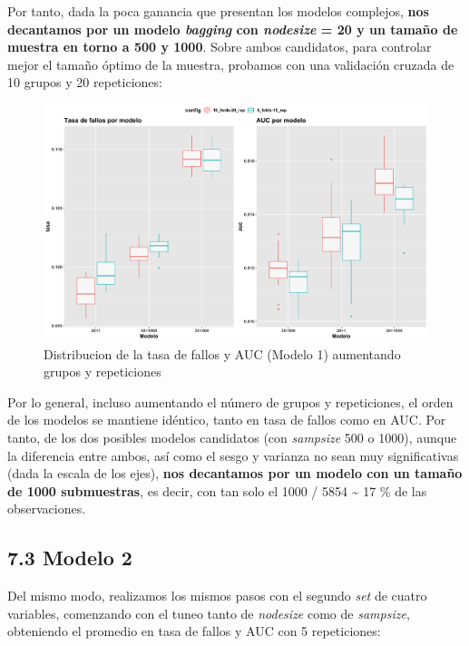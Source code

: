 \documentclass[
]{article}
\begin{document}
Por tanto, dada la poca ganancia que presentan los modelos complejos,
\textbf{nos decantamos por un modelo \emph{bagging} con \emph{nodesize}
= 20 y un tamaño de muestra en torno a 500 y 1000}. Sobre ambos
candidatos, para controlar mejor el tamaño óptimo de la muestra,
probamos con una validación cruzada de 10 grupos y 20 repeticiones:

\begin{figure}[h!]

{\centering \includegraphics[width=0.99\linewidth,height=0.99\textheight,]{./charts/bagging/bis_03_comparacion_final_modelo1_5_10_folds} 

}

\caption{Distribucion de la tasa de fallos y AUC (Modelo 1) aumentando grupos y repeticiones}\label{fig:unnamed-chunk-73}
\end{figure}

Por lo general, incluso aumentando el número de grupos y repeticiones,
el orden de los modelos se mantiene idéntico, tanto en tasa de fallos
como en AUC. Por tanto, de los dos posibles modelos candidatos (con
\emph{sampsize} 500 o 1000), aunque la diferencia entre ambos, así como
el sesgo y varianza no sean muy significativas (dada la escala de los
ejes), \textbf{nos decantamos por un modelo con un tamaño de 1000
submuestras}, es decir, con tan solo el 1000 / 5854 \textasciitilde{} 17
\% de las observaciones.

\hypertarget{modelo-2}{%
\subsection{7.3 Modelo 2}\label{modelo-2}}

Del mismo modo, realizamos los mismos pasos con el segundo \emph{set} de
cuatro variables, comenzando con el tuneo tanto de \emph{nodesize} como
de \emph{sampsize}, obteniendo el promedio en tasa de fallos y AUC con 5
repeticiones:
\end{document}
